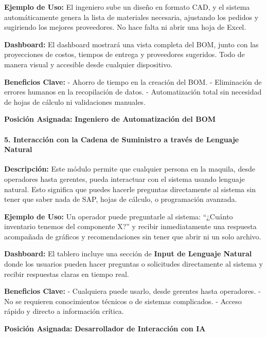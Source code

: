 \documentclass[
  10pt,
  letterpaper,
]{book}
\let\oldparagraph\paragraph
\renewcommand{\paragraph}[1]{\oldparagraph{#1}\mbox{}}
\begin{document}
\textbf{Ejemplo de Uso:} El ingeniero sube un diseño en formato CAD, y
el sistema automáticamente genera la lista de materiales necesaria,
ajustando los pedidos y sugiriendo los mejores proveedores. No hace
falta ni abrir una hoja de Excel.

\textbf{Dashboard:} El dashboard mostrará una vista completa del BOM,
junto con las proyecciones de costos, tiempos de entrega y proveedores
sugeridos. Todo de manera visual y accesible desde cualquier
dispositivo.

\textbf{Beneficios Clave:} - Ahorro de tiempo en la creación del BOM. -
Eliminación de errores humanos en la recopilación de datos. -
Automatización total sin necesidad de hojas de cálculo ni validaciones
manuales.

\textbf{Posición Asignada:} \textbf{Ingeniero de Automatización del BOM}

\paragraph{\texorpdfstring{5. \textbf{Interacción con la Cadena de
Suministro a través de Lenguaje
Natural}}{5. Interacción con la Cadena de Suministro a través de Lenguaje Natural}}\label{interacciuxf3n-con-la-cadena-de-suministro-a-travuxe9s-de-lenguaje-natural}

\textbf{Descripción:} Este módulo permite que cualquier persona en la
maquila, desde operadores hasta gerentes, pueda interactuar con el
sistema usando lenguaje natural. Esto significa que puedes hacerle
preguntas directamente al sistema sin tener que saber nada de SAP, hojas
de cálculo, o programación avanzada.

\textbf{Ejemplo de Uso:} Un operador puede preguntarle al sistema:
``¿Cuánto inventario tenemos del componente X?'' y recibir
inmediatamente una respuesta acompañada de gráficos y recomendaciones
sin tener que abrir ni un solo archivo.

\textbf{Dashboard:} El tablero incluye una sección de \textbf{Input de
Lenguaje Natural} donde los usuarios pueden hacer preguntas o
solicitudes directamente al sistema y recibir respuestas claras en
tiempo real.

\textbf{Beneficios Clave:} - Cualquiera puede usarlo, desde gerentes
hasta operadores. - No se requieren conocimientos técnicos o de sistemas
complicados. - Acceso rápido y directo a información crítica.

\textbf{Posición Asignada:} \textbf{Desarrollador de Interacción con IA}
\end{document}
